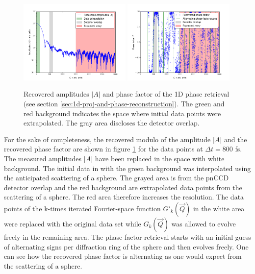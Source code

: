 \begin{figure}
	\centering
		\includegraphics[width=0.49\textwidth]{images/results/amplitude-discussion.png}
		\includegraphics[width=0.49\textwidth]{images/results/phase-discussion.png}
	\caption{Recovered amplitudes $\left|A\right|$ and phase factor of the 1D phase retrieval (see section \ref{sec:1d-proj-and-phase-reconstruction}). The green and red background indicates the space where initial data points were extrapolated. The gray area discloses the detector overlap.}
	\label{fig:amplitude-phase}
\end{figure}
For the sake of completeness, the recovered modulo of the amplitude $\left|A\right|$ and the recovered phase factor are shown in figure \ref{fig:amplitude-phase} for the data points at $\Delta t =800$ fs. The measured amplitudes $\left|A\right|$ have been replaced in the space with white background. The initial data in with the green background was interpolated using the anticipated scattering of a sphere. The grayed area is from the pnCCD detector overlap and the red background are extrapolated data points from the scattering of a sphere. The red area therefore increases the resolution. The data points of the k-times iterated Fourier-space function $G'_{k}(\vec{Q})$ in the white area were replaced with the original data set while $G_{k}(\vec{Q})$ was allowed to evolve freely in the remaining area. The phase factor retrieval starts with an initial guess of alternating signs per diffraction ring of the sphere and then evolves freely. One can see how the recovered phase factor is alternating as one would expect from the scattering of a sphere.\\
